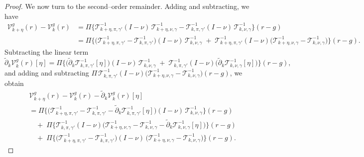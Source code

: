 \documentclass[11pt]{article}
\newcommand{\adk}{\widetilde{\partial}_k}
\theoremstyle{plain}
\begin{document}
\begin{proof}
 
We now turn to the second–order remainder. Adding and subtracting, we have
\begin{align*}
\mathcal{V}_{k+\eta}^g(r)-\mathcal{V}_k^g(r)
&= \Pi\Big\{\mathcal{T}_{k+\eta,\pi,\gamma'}^{-1}(I-\nu)\,\mathcal{T}_{k+\eta,\nu,\gamma}^{-1}
      - \mathcal{T}_{k,\pi,\gamma'}^{-1}(I-\nu)\,\mathcal{T}_{k,\nu,\gamma}^{-1}\Big\}(r-g) \\
&= \Pi\Big\{\big(\mathcal{T}_{k+\eta,\pi,\gamma'}^{-1}-\mathcal{T}_{k,\pi,\gamma'}^{-1}\big)(I-\nu)\,\mathcal{T}_{k,\nu,\gamma}^{-1}
      \;+\; \mathcal{T}_{k+\eta,\pi,\gamma'}^{-1}(I-\nu)\big(\mathcal{T}_{k+\eta,\nu,\gamma}^{-1}-\mathcal{T}_{k,\nu,\gamma}^{-1}\big)\Big\}(r-g) .
\end{align*}
Subtracting the linear term
\[
\adk \mathcal{V}_k^g(r)[\eta]
= \Pi\Big\{\big(\adk \mathcal{T}_{k,\pi,\gamma'}^{-1}[\eta]\big)(I-\nu)\,\mathcal{T}_{k,\nu,\gamma}^{-1}
\;+\; \mathcal{T}_{k,\pi,\gamma'}^{-1}(I-\nu)\big(\adk \mathcal{T}_{k,\nu,\gamma}^{-1}[\eta]\big)\Big\}(r-g),
\]
and adding and subtracting $\Pi\,\mathcal{T}_{k,\pi,\gamma'}^{-1}(I-\nu)\big(\mathcal{T}_{k+\eta,\nu,\gamma}^{-1}-\mathcal{T}_{k,\nu,\gamma}^{-1}\big)(r-g)$, we obtain
\begin{align*}
&\mathcal{V}_{k+\eta}^g(r) - \mathcal{V}_k^g(r) - \adk \mathcal{V}_k^g(r)[\eta] \\
&= \Pi\Big\{\big(\mathcal{T}_{k+\eta,\pi,\gamma'}^{-1}-\mathcal{T}_{k,\pi,\gamma'}^{-1}
      - \adk \mathcal{T}_{k,\pi,\gamma'}^{-1}[\eta]\big)(I-\nu)\,\mathcal{T}_{k,\nu,\gamma}^{-1}\Big\}(r-g) \\
&\quad+\; \Pi\Big\{\mathcal{T}_{k,\pi,\gamma'}^{-1}(I-\nu)\big(\mathcal{T}_{k+\eta,\nu,\gamma}^{-1}-\mathcal{T}_{k,\nu,\gamma}^{-1}
      - \adk \mathcal{T}_{k,\nu,\gamma}^{-1}[\eta]\big)\Big\}(r-g) \\
&\quad+\; \Pi\Big\{\big(\mathcal{T}_{k+\eta,\pi,\gamma'}^{-1}-\mathcal{T}_{k,\pi,\gamma'}^{-1}\big)
      (I-\nu)\,\big(\mathcal{T}_{k+\eta,\nu,\gamma}^{-1}-\mathcal{T}_{k,\nu,\gamma}^{-1}\big)\Big\}(r-g) .
\end{align*}




\end{proof}
\end{document}
